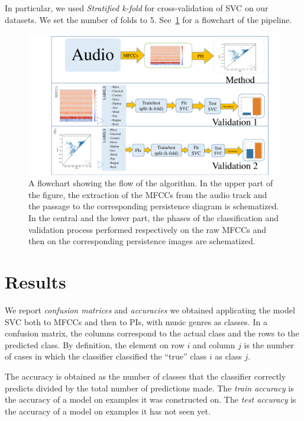 \documentclass[english, LaM, oneside, noexaminfo]{sapthesis}
\begin{document}
\noindent In particular, we used \textit{Stratified k-fold} for cross-validation of SVC on our datasets.  We set the number of folds to 5. See~\cref{fig:flow} for a flowchart of the pipeline.
% 
\begin{figure}
\centering
\includegraphics[width=\textwidth]{FLOWCHART thesis.pdf}
\caption{A flowchart showing the flow of the algorithm. In the upper part of the figure, the extraction of the MFCCs from the audio track and the passage to the corresponding persistence diagram is schematized. In the central and the lower part, the phases of the classification and validation process performed respectively on the raw MFCCs and then on the corresponding persistence images are schematized.}\label{fig:flow}
\end{figure}


\section{Results}

We report \textit{confusion matrices} and \textit{accuracies} we obtained applicating the model SVC both to MFCCs and then to PIs, with music genres as classes. In a confusion matrix, the columns correspond to the actual class and the rows to the predicted class. By definition, the element on row $i$ and column $j$ is the number of cases in which the classifier classified the ``true'' class $i$ as class $j$.
 
The accuracy is obtained as the number of classes that the classifier correctly predicts divided by the total number of predictions made.
The \textit{train accuracy} is the accuracy of a model on examples it was constructed on. The \textit{test accuracy} is the accuracy of a model on examples it has not seen yet.
\end{document}
